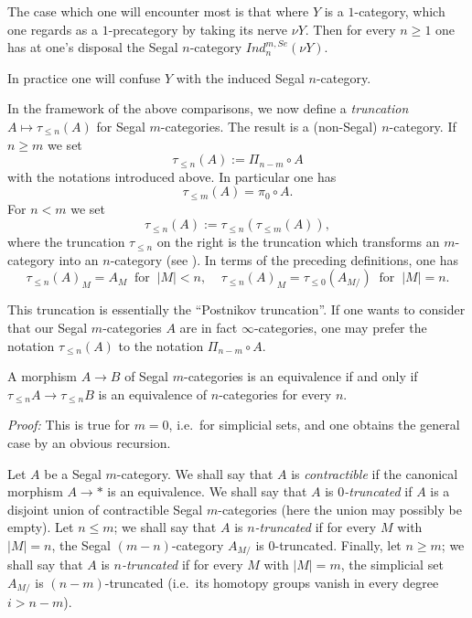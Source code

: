The case which one will encounter most is that where $Y$ is a
$1$-category, which one
regards as a $1$-precategory by taking its nerve $\nu Y$. Then
for every $n\geq 1$ one has at one's disposal the Segal $n$-category
$Ind _n^{m,Se}(\nu Y)$.

In practice one will confuse $Y$ with the
induced Segal $n$-category.




In the framework of the above comparisons,
we now define a {\em truncation} $A\mapsto \tau _{\leq n}(A)$
for Segal
$m$-categories. The result is
a (non-Segal) $n$-category.
If $n\geq m$ we set
$$
\tau _{\leq n} (A) := \Pi _{n-m} \circ A
$$
with the notations introduced above. In particular one has
$$
\tau _{\leq m}(A)= \pi _0\circ A.
$$
For $n<m$ we set
$$
\tau _{\leq n}(A):= \tau _{\leq n}(\tau _{\leq m}(A)),
$$
where the truncation $\tau _{\leq n}$ on the right is the truncation
which transforms an $m$-category into an $n$-category (see \cite{Tamsamani}).
In terms of the preceding definitions, one has
$$
\tau _{\leq n}(A)_M = A_M \;\; \mbox{for}\;\; |M|<n, \;\;\;\;
\tau _{\leq n}(A)_M = \tau _{\leq 0}(A_{M/}) \;\; \mbox{for}\;\; |M|=n.
$$

This truncation is essentially the ``Postnikov truncation''. If one wants
to consider that our Segal $m$-categories $A$ are in fact
$\infty$-categories, one may prefer the notation $\tau _{\leq n}(A)$
to the notation $\Pi _{n-m}\circ A$.


\begin{lemma}
A morphism $A\rightarrow B$ of Segal $m$-categories is an equivalence
if and only if $\tau _{\leq n}A\rightarrow \tau _{\leq n}B$ is an
equivalence of $n$-categories for every $n$.
\end{lemma}
{\em Proof:}
This is true for $m=0$, i.e.\ for simplicial sets, and one obtains the general
case by an obvious recursion.
\eop

Let $A$ be a Segal $m$-category. We shall say that $A$ is
{\em contractible} if the canonical morphism $A\rightarrow \ast$ is an
equivalence. We shall say that $A$ is {\em $0$-truncated} if $A$ is
a disjoint union of contractible Segal $m$-categories (here the
union may possibly be empty). Let $n\leq m$; we shall say that
$A$ is {\em $n$-truncated} if for every
$M$ with $|M| = n$, the Segal $(m-n)$-category $A_{M/}$ is $0$-truncated.
Finally, let $n\geq m$; we shall say that $A$ is {\em $n$-truncated} if for
every
$M$ with $|M|=m$, the simplicial set $A_{M/}$ is $(n-m)$-truncated (i.e.\ its
homotopy groups vanish in every degree $i>n-m$).

